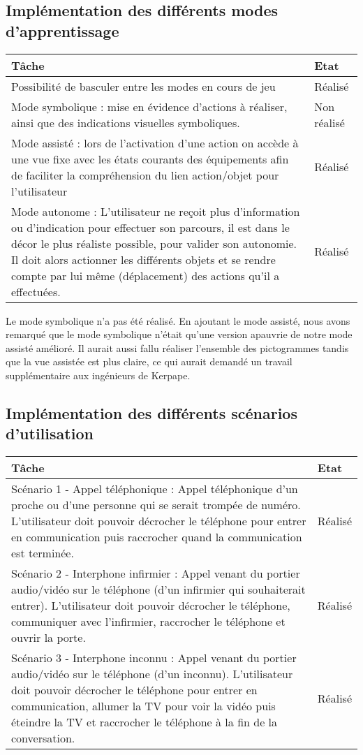 \subsection{Implémentation des différents modes d'apprentissage}
\begin{tabular}{|p{}|p{}|}
	\hline
 	\textbf{Tâche} & \textbf{Etat} \\ \hline
	Possibilité de basculer entre les modes en cours de jeu & Réalisé \\ \hline
	Mode symbolique : mise en évidence d'actions à réaliser, ainsi que des indications visuelles symboliques. & Non réalisé \\ \hline
	Mode assisté : lors de l'activation d'une action on accède à une vue fixe avec les états courants des équipements afin de faciliter la compréhension du lien action/objet pour l'utilisateur & Réalisé \\ \hline
	Mode autonome : L'utilisateur ne reçoit plus d'information ou d'indication pour effectuer son parcours, il est dans le décor le plus réaliste possible, pour valider son autonomie. Il doit alors actionner les différents objets et se rendre compte par lui même (déplacement) des actions qu'il a effectuées.  & Réalisé \\ \hline
\end{tabular}


Le mode symbolique n'a pas été réalisé. En ajoutant le mode assisté, nous avons remarqué que le mode symbolique n'était qu'une version apauvrie de notre mode assisté amélioré. Il aurait aussi fallu réaliser l'ensemble des pictogrammes tandis que la vue assistée est plus claire, ce qui aurait demandé un travail supplémentaire aux ingénieurs de Kerpape.

\subsection{Implémentation des différents scénarios d'utilisation}		
\begin{tabular}{|p{}|p{}|}
	\hline
 	\textbf{Tâche} & \textbf{Etat} \\ \hline
	Scénario 1 - Appel téléphonique : Appel téléphonique d'un proche ou d'une personne qui se serait trompée de numéro. L'utilisateur doit pouvoir décrocher le téléphone pour entrer en communication puis raccrocher quand la communication est terminée. & Réalisé \\ \hline
	Scénario 2 - Interphone infirmier : Appel venant du portier audio/vidéo sur le téléphone (d'un infirmier qui souhaiterait entrer). L'utilisateur doit pouvoir décrocher le téléphone, communiquer avec l'infirmier, raccrocher le téléphone et ouvrir la porte.& Réalisé \\ \hline
	Scénario 3 - Interphone inconnu : Appel venant du portier audio/vidéo sur le téléphone (d'un inconnu). L'utilisateur doit pouvoir décrocher le téléphone pour entrer en communication, allumer la TV pour voir la vidéo puis éteindre la TV et raccrocher le téléphone à la fin de la conversation.& Réalisé \\ \hline
\end{tabular}
		

